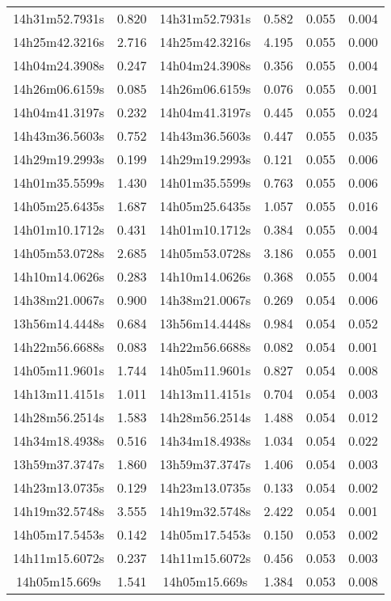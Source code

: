 \begin{table}
\begin{tabular}{cccccc}
14h31m52.7931s & 0.820 & 14h31m52.7931s & 0.582 & 0.055 & 0.004 \\
14h25m42.3216s & 2.716 & 14h25m42.3216s & 4.195 & 0.055 & 0.000 \\
14h04m24.3908s & 0.247 & 14h04m24.3908s & 0.356 & 0.055 & 0.004 \\
14h26m06.6159s & 0.085 & 14h26m06.6159s & 0.076 & 0.055 & 0.001 \\
14h04m41.3197s & 0.232 & 14h04m41.3197s & 0.445 & 0.055 & 0.024 \\
14h43m36.5603s & 0.752 & 14h43m36.5603s & 0.447 & 0.055 & 0.035 \\
14h29m19.2993s & 0.199 & 14h29m19.2993s & 0.121 & 0.055 & 0.006 \\
14h01m35.5599s & 1.430 & 14h01m35.5599s & 0.763 & 0.055 & 0.006 \\
14h05m25.6435s & 1.687 & 14h05m25.6435s & 1.057 & 0.055 & 0.016 \\
14h01m10.1712s & 0.431 & 14h01m10.1712s & 0.384 & 0.055 & 0.004 \\
14h05m53.0728s & 2.685 & 14h05m53.0728s & 3.186 & 0.055 & 0.001 \\
14h10m14.0626s & 0.283 & 14h10m14.0626s & 0.368 & 0.055 & 0.004 \\
14h38m21.0067s & 0.900 & 14h38m21.0067s & 0.269 & 0.054 & 0.006 \\
13h56m14.4448s & 0.684 & 13h56m14.4448s & 0.984 & 0.054 & 0.052 \\
14h22m56.6688s & 0.083 & 14h22m56.6688s & 0.082 & 0.054 & 0.001 \\
14h05m11.9601s & 1.744 & 14h05m11.9601s & 0.827 & 0.054 & 0.008 \\
14h13m11.4151s & 1.011 & 14h13m11.4151s & 0.704 & 0.054 & 0.003 \\
14h28m56.2514s & 1.583 & 14h28m56.2514s & 1.488 & 0.054 & 0.012 \\
14h34m18.4938s & 0.516 & 14h34m18.4938s & 1.034 & 0.054 & 0.022 \\
13h59m37.3747s & 1.860 & 13h59m37.3747s & 1.406 & 0.054 & 0.003 \\
14h23m13.0735s & 0.129 & 14h23m13.0735s & 0.133 & 0.054 & 0.002 \\
14h19m32.5748s & 3.555 & 14h19m32.5748s & 2.422 & 0.054 & 0.001 \\
14h05m17.5453s & 0.142 & 14h05m17.5453s & 0.150 & 0.053 & 0.002 \\
14h11m15.6072s & 0.237 & 14h11m15.6072s & 0.456 & 0.053 & 0.003 \\
14h05m15.669s & 1.541 & 14h05m15.669s & 1.384 & 0.053 & 0.008 \\

\end{tabular}
\end{table}
